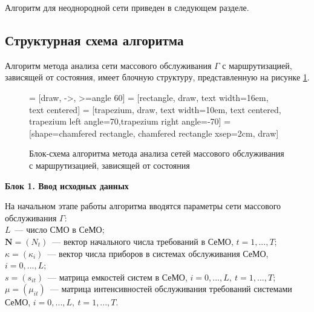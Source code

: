 Алгоритм для неоднородной сети приведен в следующем разделе.


\subsection{Структурная схема алгоритма}
\label{subsec:flowchart}

Алгоритм метода анализа сети массового обслуживания $\Gamma$ с маршрутизацией, зависящей от состояния, имеет блочную структуру, представленную на рисунке \ref{img:4.1}.

\begin{figure}[H]
\centering
{} = [draw, ->, >=angle 60]
 = [rectangle, draw, text width=16em, text centered]
 = [trapezium, draw, text width=10em, text centered, trapezium left angle=70,trapezium right angle=-70]
 = [shape=chamfered rectangle, chamfered rectangle xsep=2cm, draw]
\caption{Блок-схема алгоритма метода анализа сетей массового обслуживания с маршрутизацией, зависящей от состояния}
\label{img:4.1}
\end{figure}

\medskip
\textbf{Блок 1. Ввод исходных данных}

На начальном этапе работы алгоритма вводятся параметры сети массового обслуживания $\Gamma$:\\
$L$~--- число СМО в СеМО;\\
$\mathbf{N}=(N_t)$~--- вектор начального числа требований в СеМО, $t=1,...,T$;\\
$\kappa=(\kappa_i)$~--- вектор числа приборов в системах обслуживания СеМО, $i=0,...,L$;\\
$s=(s_{it})$~--- матрица емкостей систем в СеМО, $i=0,...,L,~t=1,...,T$;\\
$\mu=(\mu_{it})$~--- матрица интенсивностей обслуживания требований системами СеМО, $i=0,...,L,~t=1,...,T$.

